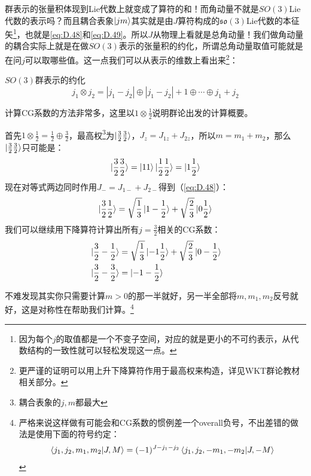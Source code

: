 群表示的张量积体现到Lie代数上就变成了算符的和！而角动量不就是$SO(3)$Lie代数的表示吗？而且耦合表象$\ket{jm}$其实就是由$J$算符构成的$\mathfrak{so}(3)$Lie代数的本征矢\footnote{因为每个$j$的取值都是一个不变子空间，对应的就是更小的不可约表示，从代数结构的一致性就可以轻松发现这一点。}，也就是\ref{eq:D.48}和\ref{eq:D.49}。所以$J$从物理上看就是总角动量！我们做角动量的耦合实际上就是在做$SO(3)$表示的张量积的约化，所谓总角动量取值可能就是在问$j$可以取哪些值。这一点我们可以从表示的维数上看出来\footnote{更严谨的证明可以用上升下降算符作用于最高权来构造，详见WKT群论教材相关部分。}：
\begin{theorem}{$SO(3)$群表示的约化}
	\begin{equation}
		j_1\otimes j_2=|j_1-j_2|\oplus|j_1-j_2|+1\oplus\cdots\oplus j_1+j_2 
	\end{equation}
\end{theorem}

计算CG系数的方法非常多，这里以$1\otimes \frac{1}{2}$说明群论出发的计算概要。

首先$1\otimes \frac{1}{2}=\frac{1}{2}\oplus\frac{3}{2}$，最高权\footnote{耦合表象的$j,m$都最大}为$\ket{\frac{3}{2}\frac{3}{2}}$，$J_z=J_{1z}+J_{2z}$，所以$m=m_1+m_2$，那么$\ket{\frac{3}{2}\frac{3}{2}}$只可能是：
\[\ket{\frac{3}{2}\frac{3}{2}}=\ket{11}\ket{\frac{1}{2}\frac{1}{2}}=\ket{1\frac{1}{2}}\]
现在对等式两边同时作用$J_{-}=J_{1-}+J_{2-}$得到（\ref{eq:D.48}）：
\begin{equation}
	\label{D.56}
	\ket{\frac{3}{2}\frac{1}{2}}=\sqrt{\frac{1}{3}}\ket{1-\frac{1}{2}}+\sqrt{\frac{2}{3}}\ket{0\frac{1}{2}}	
\end{equation}
我们可以继续用下降算符计算出所有$j=\frac{3}{2}$相关的CG系数：
\begin{align*}
	&\ket{\frac{3}{2}-\frac{1}{2}}=\sqrt{\frac{1}{3}}\ket{-1\frac{1}{2}}+\sqrt{\frac{2}{3}}\ket{0-\frac{1}{2}}\\
	&\ket{\frac{3}{2}-\frac{3}{2}}=\ket{-1-\frac{1}{2}}
\end{align*}

不难发现其实你只需要计算$m>0$的那一半就好，另一半全部将$m,m_1,m_2$反号就好，这是对称性在帮助我们计算。\footnote{严格来说这样做有可能会和CG系数的惯例差一个overall负号，不出差错的做法是使用下面的符号约定：
\[\braket{j_1,j_2,m_1,m_2|J,M}=(-1)^{J-j_1-j_2}\braket{j_1,j_2,-m_1,-m_2|J,-M}\]}

